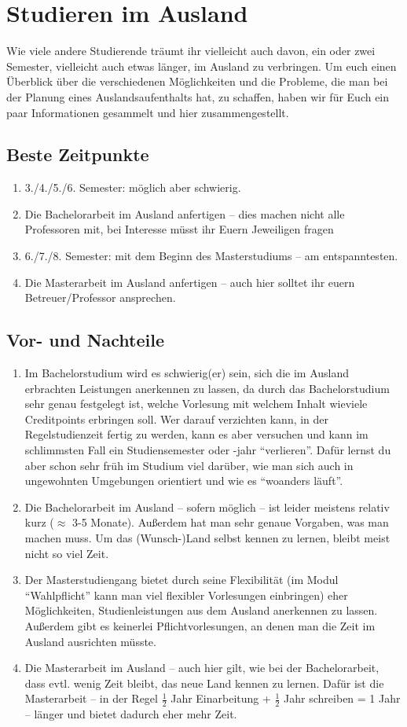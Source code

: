 \section{Studieren im Ausland}
\label{sec:Ausland}

Wie viele andere Studierende träumt ihr vielleicht auch davon, ein oder zwei Semester, vielleicht auch etwas länger, im Ausland zu verbringen.
Um euch einen Überblick über die verschiedenen Möglichkeiten und die Probleme, die man bei der Planung eines Auslandsaufenthalts hat, zu schaffen, haben wir für Euch ein paar Informationen gesammelt und hier zusammengestellt.
%
\subsection{Beste Zeitpunkte}
\begin{enumerate}
\item 3./4./5./6. Semester: möglich aber schwierig.
\item Die Bachelorarbeit im Ausland anfertigen -- dies machen nicht alle Professoren mit, bei Interesse müsst ihr Euern Jeweiligen fragen
\item 6./7./8. Semester: mit dem Beginn des Masterstudiums -- am entspanntesten.
\item Die Masterarbeit im Ausland anfertigen -- auch hier solltet ihr euern Betreuer/Professor ansprechen.
\end{enumerate}
%
\subsection{Vor- und Nachteile}
\begin{enumerate}
\item Im Bachelorstudium wird es schwierig(er) sein, sich die im Ausland erbrachten Leistungen anerkennen zu lassen, da durch das Bachelorstudium sehr genau festgelegt ist, welche Vorlesung mit welchem Inhalt wieviele Creditpoints erbringen soll. Wer darauf verzichten kann, in der Regelstudienzeit fertig zu werden, kann es aber versuchen und kann im schlimmsten Fall ein Studiensemester oder -jahr "`verlieren"'. Dafür lernst du aber schon sehr früh im Studium viel darüber, wie man sich auch in ungewohnten Umgebungen orientiert und wie es "`woanders läuft"'.
\item Die Bachelorarbeit im Ausland -- sofern möglich -- ist leider meistens relativ kurz ($\approx$ 3-5 Monate). Außerdem hat man sehr genaue Vorgaben, was man machen muss. Um das (Wunsch-)Land selbst kennen zu lernen, bleibt meist nicht so viel Zeit.
\item Der Masterstudiengang bietet durch seine Flexibilität (im Modul "`Wahlpflicht"' kann man viel flexibler Vorlesungen einbringen) eher Möglichkeiten, Studienleistungen aus dem Ausland anerkennen zu lassen. Außerdem gibt es keinerlei Pflichtvorlesungen, an denen man die Zeit im Ausland ausrichten müsste.
\item Die Masterarbeit im Ausland -- auch hier gilt, wie bei der Bachelorarbeit, dass evtl. wenig Zeit bleibt, das neue Land kennen zu lernen. Dafür ist die Masterarbeit -- in der Regel $\frac{1}{2}$ Jahr Einarbeitung + $\frac{1}{2}$ Jahr schreiben = 1 Jahr -- länger und bietet dadurch eher mehr Zeit.
\end{enumerate}
%
